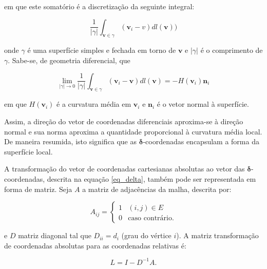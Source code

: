 \noindent em que este somatório é a discretização da seguinte integral:

\begin{equation}
\frac{1}{|\gamma|} \int_{\mathbf{v} \in \gamma} (\mathbf{v}_i - v) dl(\mathbf{v}))
\end{equation}

\noindent onde $\gamma$ é uma superfície simples e fechada em torno de $\mathbf{v}$ e $|\gamma|$ é o comprimento de $\gamma$. Sabe-se, de geometria diferencial, que

\begin{equation}
\lim_{|\gamma| \rightarrow 0} \frac{1}{|\gamma|} \int_{\mathbf{v} \in \gamma} (\mathbf{v}_i - \mathbf{v}) dl(\mathbf{v}) = -H(\mathbf{v}_i)\mathbf{n}_i
\end{equation}

\noindent em que $H(\mathbf{v}_i)$ é a curvatura média em $\mathbf{v}_i$ e $\mathbf{n}_i$ é o vetor normal à superfície.

Assim, a direção do vetor de coordenadas diferenciais aproxima-se à direção normal e sua norma aproxima a quantidade proporcional à curvatura média local. De maneira resumida, isto significa que as $\mathbf{\delta}$-coordenadas encapsulam a forma da superfície local. %


A transformação do vetor de coordenadas cartesianas absolutas ao vetor das $\mathbf{\delta}$-coordenadas, descrita na equação \ref{eq_delta}, também pode ser representada em forma de matriz. Seja $A$ a matriz de adjacências da malha, descrita por:

\begin{equation}\label{eqMatAdj}
A_{ij} = \begin{cases}
1&(i, j) \in E\\
0&\text{caso contrário.}
\end{cases}
\end{equation}

\noindent e $D$ matriz diagonal tal que $D_{ii} = d_i$ (grau do vértice $i$). A matriz transformação de coordenadas absolutas para as coordenadas relativas é:

\begin{equation}
L = I - D^{-1}A.
\end{equation}

